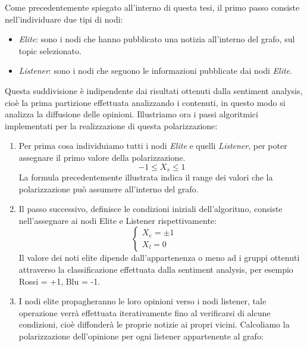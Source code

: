 Come precedentemente spiegato all'interno di questa tesi, il primo passo consiste nell'individuare due tipi di nodi: 
\begin{itemize}
\item \textit{Elite}: sono i nodi che hanno pubblicato una notizia all'interno del grafo, sul topic selezionato.
\item \textit{Listener}: sono i nodi che seguono le informazioni pubblicate dai nodi \textit{Elite}.
\end{itemize}
Questa suddivisione è indipendente dai risultati ottenuti dalla sentiment analysis, cioè la prima partizione effettuata analizzando i contenuti, in questo modo si analizza la diffusione delle opinioni.
Illustriamo ora i passi algoritmici implementati per la realizzazione di questa polarizzazione:
\begin{enumerate}
\item Per prima cosa individuiamo tutti i nodi \textit{Elite} e quelli \textit{Listener}, per poter assegnare il primo valore della polarizzazione.
\begin{equation}
-1\leq X_{s}\leq1
\end{equation}
La formula precedentemente illustrata indica il range dei valori che la polarizzazione può assumere all'interno del grafo. 
\item Il passo successivo, definisce le condizioni iniziali dell'algoritmo, consiste nell'assegnare ai nodi Elite e Listener rispettivamente:
\[
\begin{cases}
    X_{e}= \pm1      & \quad \\
    X_{l}=0  & \quad 
  \end{cases}
\]
Il valore dei noti elite dipende dall'appartenenza o meno ad i gruppi ottenuti attraverso la classificazione effettuata dalla sentiment analysis, per esempio Rossi = +1, Blu = -1.
\item I nodi elite propagheranno le loro opinioni verso i nodi listener, tale operazione verrà effettuata iterativamente fino al verificarsi di alcune condizioni, cioè diffonderà le proprie notizie ai propri vicini.
Calcoliamo la polarizzazione dell'opinione per ogni listener appartenente al grafo:


\end{enumerate}
